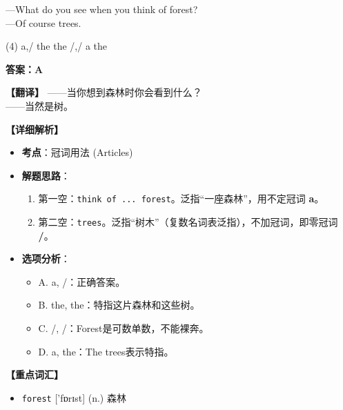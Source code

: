 \documentclass[11pt, a4paper]{article}
\newcommand{\analysis}[4]{
    \begin{solutionbox}
        \textbf{答案：#1}
        
        \textbf{【翻译】} #2
        
        \textbf{【详细解析】}
        #3
        
        \textbf{【重点词汇】}
        #4
    \end{solutionbox}
}
\newcommand{\blank}{\underline{\hspace{1.5cm}}}
\begin{document}
\begin{questions}
    \item ---What do you see when you think of \blank forest? \\
    ---Of course \blank trees.
    \begin{tasks}(4)
        \task a,/ \task the the \task /,/ \task a the
    \end{tasks}
    \analysis{A}{——当你想到森林时你会看到什么？\\——当然是树。}{
        \begin{itemize}
            \item \textbf{考点}：冠词用法 (Articles)
            \item \textbf{解题思路}：
                \begin{enumerate}
                    \item 第一空：\texttt{think of ... forest}。泛指“一座森林”，用不定冠词 \textbf{a}。
                    \item 第二空：\texttt{trees}。泛指“树木”（复数名词表泛指），不加冠词，即零冠词 \textbf{/}。
                \end{enumerate}
            \item \textbf{选项分析}：
                \begin{itemize}
                    \item A. a, /：正确答案。
                    \item B. the, the：特指这片森林和这些树。
                    \item C. /, /：Forest是可数单数，不能裸奔。
                    \item D. a, the：The trees表示特指。
                \end{itemize}
        \end{itemize}
    }{
        \begin{itemize}
            \item \texttt{forest} ['fɒrɪst] (n.) 森林
        \end{itemize}
    }


\end{questions}
\end{document}
